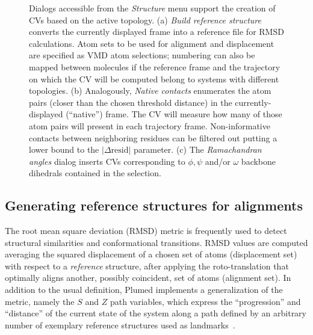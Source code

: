 \documentclass[preprint,12pt]{elsarticle}
\begin{document}
\begin{figure}
  \caption{Dialogs accessible from the \emph{Structure} menu support
    the creation of CVs based on the active topology. (a) \emph{Build
      reference structure} converts the currently displayed frame into
    a reference file for RMSD calculations.  Atom sets to be used for
    alignment and displacement are specified as VMD atom selections;
    numbering can also be mapped between molecules if the reference
    frame and the trajectory on which the CV will be computed belong
    to systems with different topologies. (b) Analogously,
    \emph{Native contacts} enumerates  the atom pairs (closer
    than the chosen threshold distance) in the currently-displayed
    (``native'') frame. The CV will measure how many of
    those atom pairs will present in each trajectory frame. 
    Non-informative contacts between neighboring residues can be
    filtered out putting a lower bound to the $| \Delta \mbox{resid}
    |$ parameter. (c) The \emph{Ramachandran angles} dialog inserts
    CVs corresponding to $\phi, \psi$ and/or $\omega$ backbone
    dihedrals contained in the selection.}\label{fig:structure}
\end{figure}

\subsection{Generating reference structures for alignments}


The root mean square deviation (RMSD) metric is frequently used to
detect structural similarities and conformational transitions.  RMSD
values are computed averaging the squared displacement of a chosen set
of atoms (displacement set) with respect to a \emph{reference}
structure,  after applying the roto-translation that optimally
aligns another, possibly coincident, set of atoms (alignment set).  In
addition to the usual definition, Plumed implements a generalization
of the metric, namely the $S$ and $Z$ path variables, which express
the ``progression'' and ``distance'' of the current state of the
system along a path defined by an arbitrary number of exemplary
reference structures used as
landmarks~\cite{Branduardi_Gervasio_Parrinello_2007}.


\end{document}
